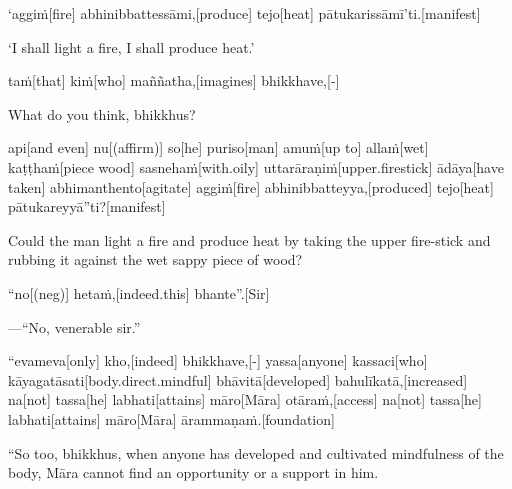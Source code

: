 \begin{samepage}
\begingl[glneveryline={\PaliGlossA,\PaliGlossB}]
‘aggiṁ[fire] abhinibbattessāmi,[produce] tejo[heat] pātukarissāmī’ti.[manifest]
\endgl
\nopagebreak
\linespread{0.5}
\begin{spacin}{0.2}
{\PaliGlossFT ‘I shall light a fire, I shall produce heat.’}
\end{spacin}
\vskip 12pt
\end{samepage}
\begin{samepage}
\begingl[glneveryline={\PaliGlossA,\PaliGlossB}]
taṁ[that] kiṁ[who] maññatha,[imagines] bhikkhave,[-]
\endgl
\nopagebreak
\linespread{0.5}
\begin{spacin}{0.2}
{\PaliGlossFT What do you think, bhikkhus?}
\end{spacin}
\vskip 12pt
\end{samepage}
\begin{samepage}
\begingl[glneveryline={\PaliGlossA,\PaliGlossB}]
api[and even] nu[(affirm)] so[he] puriso[man] amuṁ[up to] allaṁ[wet] kaṭṭhaṁ[piece wood] sasnehaṁ[with.oily] uttarāraṇiṁ[upper.firestick] ādāya[have taken] abhimanthento[agitate] aggiṁ[fire] abhinibbatteyya,[produced] tejo[heat] pātukareyyā”ti?[manifest]
\endgl
\nopagebreak
\linespread{0.5}
\begin{spacin}{0.2}
{\PaliGlossFT Could the man light a fire and produce heat by taking the upper fire-stick and rubbing it against the wet sappy piece of wood?}
\end{spacin}
\vskip 12pt
\end{samepage}
\begin{samepage}
\begingl[glneveryline={\PaliGlossA,\PaliGlossB}]
“no[(neg)] hetaṁ,[indeed.this] bhante”.[Sir]
\endgl
\nopagebreak
\linespread{0.5}
\begin{spacin}{0.2}
{\PaliGlossFT —“No, venerable sir.”}
\end{spacin}
\vskip 12pt
\end{samepage}
\begin{samepage}
\begingl[glneveryline={\PaliGlossA,\PaliGlossB}]
“evameva[only] kho,[indeed] bhikkhave,[-] yassa[anyone] kassaci[who] kāyagatāsati[body.direct.mindful] bhāvitā[developed] bahulīkatā,[increased] na[not] tassa[he] labhati[attains] māro[Māra] otāraṁ,[access] na[not] tassa[he] labhati[attains] māro[Māra] ārammaṇaṁ.[foundation]
\endgl
\nopagebreak
\linespread{0.5}
\begin{spacin}{0.2}
{\PaliGlossFT “So too, bhikkhus, when anyone has developed and cultivated mindfulness of the body, Māra cannot find an opportunity or a support in him.}
\end{spacin}
\vskip 12pt
\end{samepage}
